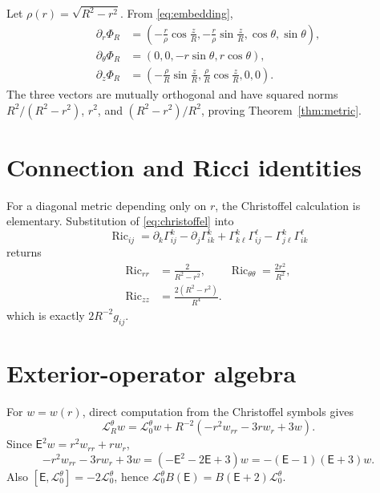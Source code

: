 \documentclass[aps,prd,reprint,superscriptaddress,nofootinbib,floatfix]{revtex4-2}
\theoremstyle{definition}
\theoremstyle{remark}
\newcommand{\Ric}{\operatorname{Ric}}
\newcommand{\cL}{\mathcal{L}}
\newcommand{\Eul}{\mathsf E}
\begin{document}
Let $\rho(r)=\sqrt{R^2-r^2}$. From \cref{eq:embedding},
\begin{align}
	\partial_r\Phi_R      & =\left(-\frac r\rho\cos\frac zR,-\frac r\rho\sin\frac zR,\cos\theta,\sin\theta\right), \\
	\partial_\theta\Phi_R & =(0,0,-r\sin\theta,r\cos\theta),                                                       \\
	\partial_z\Phi_R      & =\left(-\frac\rho R\sin\frac zR,\frac\rho R\cos\frac zR,0,0\right).
\end{align}
The three vectors are mutually orthogonal and have squared norms $R^2/(R^2-r^2)$, $r^2$, and $(R^2-r^2)/R^2$, proving Theorem~\ref{thm:metric}.


\section{Connection and Ricci identities}\label{app:connection}

For a diagonal metric depending only on $r$, the Christoffel calculation is elementary. Substitution of \cref{eq:christoffel} into
\begin{equation}
	\Ric_{ij}=\partial_k\Gamma^k_{ij}-\partial_j\Gamma^k_{ik}
	+\Gamma^k_{k\ell}\Gamma^\ell_{ij}-\Gamma^k_{j\ell}\Gamma^\ell_{ik}
\end{equation}
returns
\begin{align}
	\Ric_{rr} & =\frac{2}{R^2-r^2},\qquad
	\Ric_{\theta\theta}=\frac{2r^2}{R^2},\nonumber \\
	\Ric_{zz} & =\frac{2(R^2-r^2)}{R^4}.
\end{align}
which is exactly $2R^{-2}g_{ij}$.



\section{Exterior-operator algebra}\label{app:extalg}

For $w=w(r)$, direct computation from the Christoffel symbols gives
\begin{equation}
	\cL_R^\theta w
	=\cL_0^\theta w+R^{-2}(-r^2w_{rr}-3rw_r+3w).
\end{equation}
Since $\Eul^2w=r^2w_{rr}+rw_r$,
\begin{equation}
	-r^2w_{rr}-3rw_r+3w
	=(-\Eul^2-2\Eul+3)w=-(\Eul-1)(\Eul+3)w.
\end{equation}
Also $[\Eul,\cL_0^\theta]=-2\cL_0^\theta$, hence
$\cL_0^\theta B(\Eul)=B(\Eul+2)\cL_0^\theta$.
\end{document}
